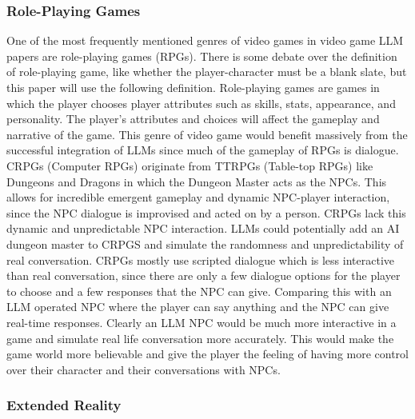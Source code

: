 \documentclass[10pt,twocolumn]{article}
\begin{document}
        \subsubsection{Role-Playing Games}

            \par
            One of the most frequently mentioned genres of video games in video game LLM papers are role-playing games (RPGs). There is some debate over the definition of role-playing game, like whether the player-character must be a blank slate, but this paper will use the following definition. Role-playing games are games in which the player chooses player attributes such as skills, stats, appearance, and personality. The player's attributes and choices will affect the gameplay and narrative of the game. This genre of video game would benefit massively from the successful integration of LLMs since much of the gameplay of RPGs is dialogue. CRPGs (Computer RPGs) originate from TTRPGs (Table-top RPGs) like Dungeons and Dragons in which the Dungeon Master acts as the NPCs. This allows for incredible emergent gameplay and dynamic NPC-player interaction, since the NPC dialogue is improvised and acted on by a person. CRPGs lack this dynamic and unpredictable NPC interaction. LLMs could potentially add an AI dungeon master to CRPGS and simulate the randomness and unpredictability of real conversation. CRPGs mostly use scripted dialogue which is less interactive than real conversation, since there are only a few dialogue options for the player to choose and a few responses that the NPC can give. Comparing this with an LLM operated NPC where the player can say anything and the NPC can give real-time responses. Clearly an LLM NPC would be much more interactive in a game and simulate real life conversation more accurately. This would make the game world more believable and give the player the feeling of having more control over their character and their conversations with NPCs.

        \subsubsection{Extended Reality}
\end{document}
